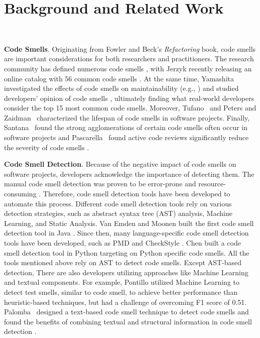 \vspace*{-0.5em}

\section{Background and Related Work}~\label{sec:background}

\vspace*{-1em}


{\bf Code Smells}. Originating from Fowler and Beck's \textit{Refactoring}
book, code smells are important considerations for both researchers and
practitioners. The research community has defined numerous code smells
\cite{Pysmell,SQLAntipatterns,CleanCode,RefactoringWorkbook}, with Jerzyk
recently releasing an online catalog with 56 common code smells
\cite{Jerzyk2023}. At the same time, Yamashita investigated the effects of code
smells on maintainability (e.g., \cite{6392174, 6405287}) and studied
developers' opinion of code smells \cite{developersCare}, ultimately finding
what real-world developers consider the top 15 most common code smells.
Moreover, Tufano~\etal{} \cite{whenandwhy} and Peters and
Zaidman~\cite{lifespan} characterized the lifespan of code smells in software
projects. Finally, Santana~\etal{} found the strong agglomerations of certain
code smells often occur in software projects \cite{Santana} and
Pascarella~\etal{} found active code reviews significantly reduce the severity
of code smells \cite{Pascarella}.

{\bf Code Smell Detection}. Because of the negative impact of code smells on
software projects, developers acknowledge the importance of detecting them. The
manual code smell detection was proven to be error-prone and resource-consuming
\cite{DetectingDefectsInObject}. Therefore, code smell detection tools have been
developed to automate this process. Different code smell detection tools rely on
various detection strategies, such as abstract syntax tree (AST) analysis,
Machine Learning, and Static Analysis. Van Emden and Moonen built the first code
smell detection tool in Java \cite{1173068}. Since then, many language-specific
code smell detection tools have been developed, such as PMD \cite{PMD} and
CheckStyle \cite{CheckStyle}. Chen \cite{Pysmell} built a code smell detection
tool in Python targeting on Python specific code smells. All the tools mentioned
above rely on AST to detect code smells. Except AST-based detection, There are
also developers utilizing approaches like Machine Learning and textual
components. For example, Pontillo utilized Machine Learning to detect test
smells, similar to code smell, to achieve better performance than
heuristic-based techniques, but had a challenge of overcoming F1 score of 0.51.
Palomba~\etal{} designed a text-based code smell technique to detect code smells
and found the benefits of combining textual and structural information in code
smell detection \cite{Palomba}.

